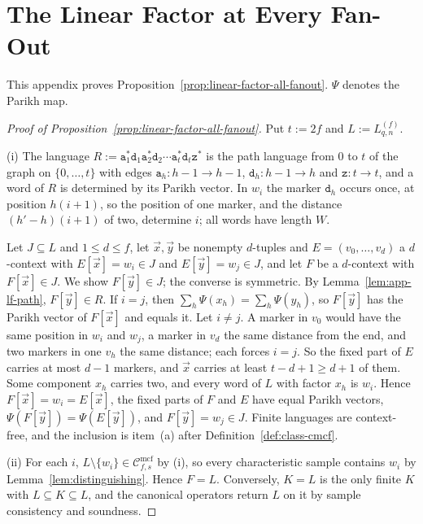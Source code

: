 \documentclass[11pt]{article}
\numberwithin{equation}{section}
\theoremstyle{plain}
\theoremstyle{definition}
\theoremstyle{remark}
\newcommand{\Cmcf}[2]{\mathcal{C}^{\mathrm{mcf}}_{#1,#2}}
\newcommand{\tuple}[1]{\vec{#1}}
\theoremstyle{plain}
\begin{document}
\section{The Linear Factor at Every Fan-Out}
\label{app:linear-factor-fanout}

This appendix proves Proposition~\ref{prop:linear-factor-all-fanout}.  $\Psi$ denotes the Parikh map.

\begin{proof}[Proof of Proposition~\ref{prop:linear-factor-all-fanout}]
Put $t:=2f$ and $L:=L^{(f)}_{q,n}$.

(i) The language $R:=\mathtt a_1^*\mathtt d_1\mathtt a_2^*\mathtt d_2\cdots
\mathtt a_t^*\mathtt d_t\mathtt z^*$ is the path language from $0$ to $t$ of the graph
on $\{0,\ldots,t\}$ with edges $\mathtt a_h:h-1\to h-1$, $\mathtt d_h:h-1\to h$ and
$\mathtt z:t\to t$, and a word of $R$ is determined by its Parikh vector.  In
$w_i$ the marker $\mathtt d_h$ occurs once, at position $h(i+1)$, so the position
of one marker, and the distance $(h'-h)(i+1)$ of two, determine $i$; all words
have length $W$.

Let $J\subseteq L$ and $1\le d\le f$, let $\tuple x,\tuple y$ be nonempty
$d$-tuples and $E=(v_0,\ldots,v_d)$ a $d$-context with $E[\tuple x]=w_i\in J$ and
$E[\tuple y]=w_j\in J$, and let $F$ be a $d$-context with $F[\tuple x]\in J$.  We
show $F[\tuple y]\in J$; the converse is symmetric.  By
Lemma~\ref{lem:app-lf-path}, $F[\tuple y]\in R$.  If $i=j$, then
$\sum_h\Psi(x_h)=\sum_h\Psi(y_h)$, so $F[\tuple y]$ has the Parikh vector of
$F[\tuple x]$ and equals it.  Let $i\ne j$.  A marker in $v_0$ would have the same
position in $w_i$ and $w_j$, a marker in $v_d$ the same distance from the end,
and two markers in one $v_h$ the same distance; each forces $i=j$.  So the fixed
part of $E$ carries at most $d-1$ markers, and $\tuple x$ carries at least
$t-d+1\ge d+1$ of them.  Some component $x_h$ carries two, and every word of $L$
with factor $x_h$ is $w_i$.  Hence $F[\tuple x]=w_i=E[\tuple x]$, the fixed parts
of $F$ and $E$ have equal Parikh vectors, $\Psi(F[\tuple y])=\Psi(E[\tuple y])$, and
$F[\tuple y]=w_j\in J$.  Finite languages are context-free, and the inclusion is
item~(a) after Definition~\ref{def:class-cmcf}.

(ii) For each $i$, $L\setminus\{w_i\}\in\Cmcf{f}{s}$ by (i), so every
characteristic sample contains $w_i$ by Lemma~\ref{lem:distinguishing}.  Hence
$F=L$.  Conversely,
$K=L$ is the only finite $K$ with $L\subseteq K\subseteq L$, and the canonical
operators return $L$ on it by sample consistency and soundness.


\end{proof}
\end{document}
